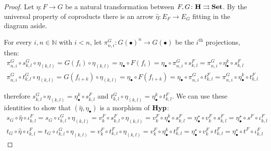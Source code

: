 \documentclass[3p]{elsarticle}
\newcommand{\Set}{\mathbf{Set}}
\def\E{\textbf {\textup{E}}}
\newcommand{\catname}[1]{\textbf{\textup{#1}}}
\newcommand{\hyp}{\catname{Hyp}}
\theoremstyle{remark}
\theoremstyle{definition}
\begin{document}
\begin{proof}\label{proof:equi}
	Let $\eta\colon F\rightarrow G$ be a natural transformation between $F, G\colon \catname{H}\rightrightarrows \Set$.  By the universal property of coproducts there is an arrow $\hat{\eta}\colon E_F\to E_G$ fitting in the diagram aside.
	
	\smallskip 
	\noindent 
	\begin{minipage}[r]{.8\linewidth}
		\setlength{\parindent}{1.5em}
		For every $i, n\in \mathbb{N}$ with $i< n$, let $\pi^G_{n, i}\colon G(\bullet)^n\to G(\bullet)$ be the $i^{\mathrm{th}}$ projections, then:
		\begin{gather*}
			\pi^G_{n, i}\circ s^G_{k,l}\circ \eta_{(k,l)} = G(f_i)\circ \eta_{(k,l)} = \eta_\bullet \circ F(f_i) = \eta_\bullet \circ \pi^G_{n, i} \circ s^F_{k,l} = \pi^G_{n, i}\circ \eta^k_\bullet  \circ s^F_{k,l}\\
			\pi^G_{n, i}\circ t^G_{k,l}\circ \eta_{(k,l)} = G(f_{i+k})\circ \eta_{(k,l)} = \eta_\bullet \circ F(f_{i+k}) = \eta_\bullet \circ \pi^G_{n, i} \circ t^F_{k,l} = \pi^G_{n, i}\circ \eta^k_\bullet \circ  t^F_{k,l}
		\end{gather*}
	\end{minipage}
	\hfill
	\begin{minipage}[l]{.15\linewidth} \vspace{-.5cm}
	\end{minipage}

	\smallskip \noindent 
	therefore  $s^G_{k,l}\circ \eta_{(k,l)} =  \eta^k_\bullet  \circ s^F_{k,l}$ and $t^G_{k,l}\circ \eta_{(k,l)} =  \eta^k_\bullet \circ t^F_{k,l}$. We can use these identities to show that $(\hat{\eta}, \eta_{\bullet})$ is a morphism of $\hyp$:
	\begin{gather*}
		s_G\circ \hat{\eta} \circ \iota^F_{k,l}=s_G\circ \iota^G_{k,l}\circ \eta_{(k,l)}=v^F_k\circ s^F_{k,l}\circ \eta_{(k,l)} = v^F_k \circ \eta^k_\bullet  \circ s^F_{k,l} = \eta^\star_\bullet \circ v^F_k\circ s^{F}_{k,l} =\eta^\star_\bullet \circ s^F\circ \iota^F_{k,l}\\
		t_G\circ \hat{\eta} \circ \iota^F_{k,l}=t_G\circ \iota^G_{k,l}\circ \eta_{(k,l)}=v^F_k\circ t^F_{k,l}\circ \eta_{(k,l)} = v^F_k \circ \eta^k_\bullet  \circ t^F_{k,l} = \eta^\star_\bullet \circ v^F_k\circ t^{F}_{k,l} =\eta^\star_\bullet \circ t^F\circ \iota^F_{k,l}
	\end{gather*}
	

\end{proof}
\end{document}

